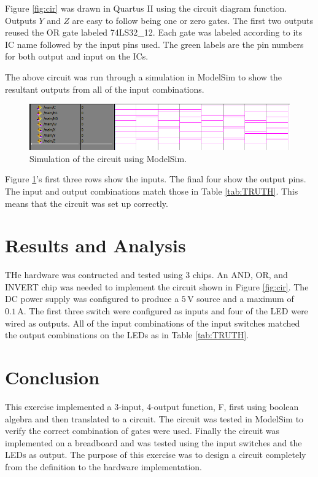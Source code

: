\documentclass[CMPE]{KGCOEReport}
\begin{document}
Figure \ref{fig:cir} was drawn in Quartus II using the circuit diagram function. Outputs \(Y\) and \(Z\) are easy to follow being one or zero gates. The first two outputs reused the OR gate labeled 74LS32\_12. Each gate was labeled according to its IC name followed by the input pins used. The green labels are the pin numbers for both output and input on the ICs.\par

The above circuit was run through a simulation in ModelSim to show the resultant outputs from all of the input combinations.

\begin{figure}[htbp]
	\centering
	\includegraphics[width=\textwidth]{modelsim}
	\caption{Simulation of the circuit using ModelSim.}
	\label{fig:sim}
\end{figure}

Figure \ref{fig:sim}'s first three rows show the inputs. The final four show the output pins. The input and output combinations match those in Table \ref{tab:TRUTH}. This means that the circuit was set up correctly.

\section*{Results and Analysis}

THe hardware was contructed and tested using 3 chips. An AND, OR, and INVERT chip was needed to implement the circuit shown in Figure \ref{fig:cir}. The DC power supply was configured to produce a $5\,\si\volt$ source and a maximum of $0.1\,\si\ampere$. The first three switch were configured as inputs and four of the LED were wired as outputs. All of the input combinations of the input switches matched the output combinations on the LEDs as in Table \ref{tab:TRUTH}.

\section*{Conclusion}

This exercise implemented a 3-input, 4-output function, F, first using boolean algebra and then translated to a circuit. The circuit was tested in ModelSim to verify the correct combination of gates were used. Finally the circuit was implemented on a breadboard and was tested using the input switches and the LEDs as output. The purpose of this exercise was to design a circuit completely from the definition to the hardware implementation.
\end{document}
